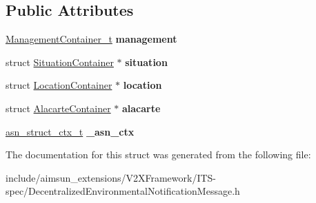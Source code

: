 \subsection*{Public Attributes}
\begin{DoxyCompactItemize}
\item 
\hyperlink{structManagementContainer}{Management\+Container\+\_\+t} {\bfseries management}\hypertarget{structDecentralizedEnvironmentalNotificationMessage_adce2d62419af25732ca19e89c7678136}{}\label{structDecentralizedEnvironmentalNotificationMessage_adce2d62419af25732ca19e89c7678136}

\item 
struct \hyperlink{structSituationContainer}{Situation\+Container} $\ast$ {\bfseries situation}\hypertarget{structDecentralizedEnvironmentalNotificationMessage_a8c72e22397891ed99385887ee1d195e1}{}\label{structDecentralizedEnvironmentalNotificationMessage_a8c72e22397891ed99385887ee1d195e1}

\item 
struct \hyperlink{structLocationContainer}{Location\+Container} $\ast$ {\bfseries location}\hypertarget{structDecentralizedEnvironmentalNotificationMessage_a36e623546143b8f80b75a00b39c6e3bd}{}\label{structDecentralizedEnvironmentalNotificationMessage_a36e623546143b8f80b75a00b39c6e3bd}

\item 
struct \hyperlink{structAlacarteContainer}{Alacarte\+Container} $\ast$ {\bfseries alacarte}\hypertarget{structDecentralizedEnvironmentalNotificationMessage_a5606ee135f985d16ba44fbdf2f472804}{}\label{structDecentralizedEnvironmentalNotificationMessage_a5606ee135f985d16ba44fbdf2f472804}

\item 
\hyperlink{structasn__struct__ctx__s}{asn\+\_\+struct\+\_\+ctx\+\_\+t} {\bfseries \+\_\+asn\+\_\+ctx}\hypertarget{structDecentralizedEnvironmentalNotificationMessage_abb2644655f39413b2c061b4c06e53461}{}\label{structDecentralizedEnvironmentalNotificationMessage_abb2644655f39413b2c061b4c06e53461}

\end{DoxyCompactItemize}


The documentation for this struct was generated from the following file\+:\begin{DoxyCompactItemize}
\item 
include/aimsun\+\_\+extensions/\+V2\+X\+Framework/\+I\+T\+S-\/spec/Decentralized\+Environmental\+Notification\+Message.\+h\end{DoxyCompactItemize}
